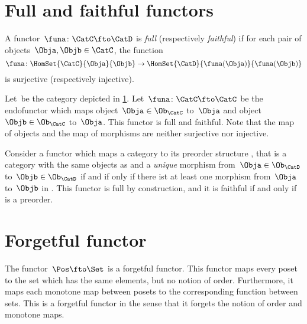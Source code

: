 

\section{Full and faithful functors}
\begin{ctdefinition}
  \label{def:functorfullfaith}
  A functor~$\funa\colon \CatC \fto \CatD$ is \emph{full} (respectively \emph{faithful}) if for each pair of objects~$\Obja,\Objb\in \CatC$, the function
  \begin{equation}
    \funa \colon \HomSet{\CatC}{\Obja}{\Objb} \to \HomSet{\CatD}{\funa(\Obja)}{\funa(\Objb)}
  \end{equation}
  is surjective (respectively injective).
\end{ctdefinition}

\begin{example}
  Let~\CatC be the category depicted in \cref{fig:ex_full_faithful_1}. Let~$\funa\colon \CatC \fto \CatC$ be the endofunctor which maps object~$\Obja\in \Ob_{\CatC}$ to~$\Obja$ and object~$\Objb\in \Ob_{\CatC}$ to~$\Obja$. This functor is full and faithful. Note that the map of objects and the map of morphisms are neither surjective nor injective.

  \begin{figure}[h!]
    \centering
    \caption{\label{fig:ex_full_faithful_1}}
  \end{figure}
\end{example}

\begin{example}
  Consider a functor which maps a category \CatC to its preorder structure \CatD, that is a category with the same objects as \CatC and a \emph{unique} morphism from~$\Obja\in \Ob_\CatD$ to~$\Objb\in \Ob_\CatD$ if and if only if there ist at least one morphism from~$\Obja$ to~$\Objb$ in \CatC. This functor is full by construction, and it is faithful if and only if \CatC is a preorder.
\end{example}


\section{Forgetful functor}


\begin{example}
  The functor~$\Pos \fto \Set$ is a forgetful functor. This functor maps every poset to the set which has the same elements, but no notion of order. Furthermore, it maps each monotone map between posets to the corresponding function between sets. This is a forgetful functor in the sense that it forgets the notion of order and monotone maps.
\end{example}

